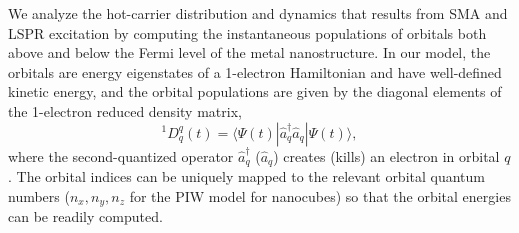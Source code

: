 \documentclass[journal=jpclcd,manuscript=letter]{achemso}
\begin{document}
We analyze the hot-carrier distribution and dynamics that results from SMA and LSPR excitation by computing the 
instantaneous populations of orbitals both above and below the Fermi level of the metal nanostructure.   
In our model, the orbitals are energy eigenstates of a 1-electron Hamiltonian and have well-defined kinetic energy,
and the orbital populations are given by the diagonal elements of the 1-electron reduced density matrix,
\begin{equation}
^1D^q_q(t) = \langle \Psi(t) | \hat{a}^{\dagger}_q \hat{a}_q | \Psi(t) \rangle,
\end{equation} 
where the second-quantized operator $\hat{a}_q^{\dagger}$ ($\hat{a}_q$) creates (kills) an electron
in orbital $q$.  The orbital indices can be uniquely mapped to the relevant orbital quantum numbers ($n_x, n_y, n_z$ for
the PIW model for nanocubes) so that the orbital energies can be readily computed. 
\end{document}

